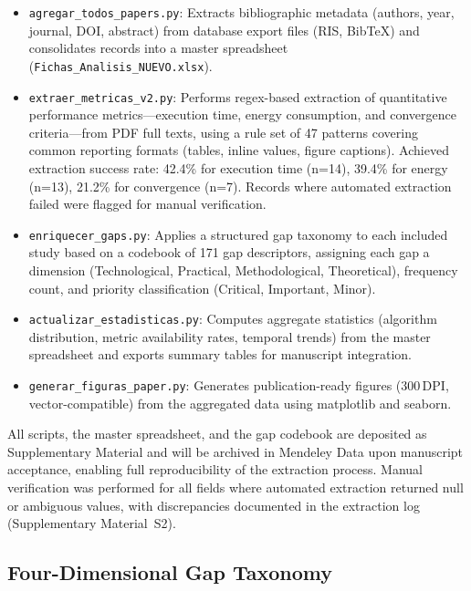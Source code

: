 \documentclass[review,3p,times]{elsarticle}
\begin{document}
\begin{itemize}
  \item \texttt{agregar\_todos\_papers.py}: Extracts bibliographic metadata (authors, year, journal, DOI, abstract) from database export files (RIS, BibTeX) and consolidates records into a master spreadsheet (\texttt{Fichas\_Analisis\_NUEVO.xlsx}).
  \item \texttt{extraer\_metricas\_v2.py}: Performs regex-based extraction of quantitative performance metrics---execution time, energy consumption, and convergence criteria---from PDF full texts, using a rule set of 47 patterns covering common reporting formats (tables, inline values, figure captions). Achieved extraction success rate: 42.4\% for execution time (n=14), 39.4\% for energy (n=13), 21.2\% for convergence (n=7). Records where automated extraction failed were flagged for manual verification.
  \item \texttt{enriquecer\_gaps.py}: Applies a structured gap taxonomy to each included study based on a codebook of 171 gap descriptors, assigning each gap a dimension (Technological, Practical, Methodological, Theoretical), frequency count, and priority classification (Critical, Important, Minor).
  \item \texttt{actualizar\_estadisticas.py}: Computes aggregate statistics (algorithm distribution, metric availability rates, temporal trends) from the master spreadsheet and exports summary tables for manuscript integration.
  \item \texttt{generar\_figuras\_paper.py}: Generates publication-ready figures (300\,DPI, vector-compatible) from the aggregated data using matplotlib and seaborn.
\end{itemize}

All scripts, the master spreadsheet, and the gap codebook are deposited as Supplementary Material and will be archived in Mendeley Data upon manuscript acceptance, enabling full reproducibility of the extraction process. Manual verification was performed for all fields where automated extraction returned null or ambiguous values, with discrepancies documented in the extraction log (Supplementary Material~S2).

\subsection{Four-Dimensional Gap Taxonomy}
\end{document}
